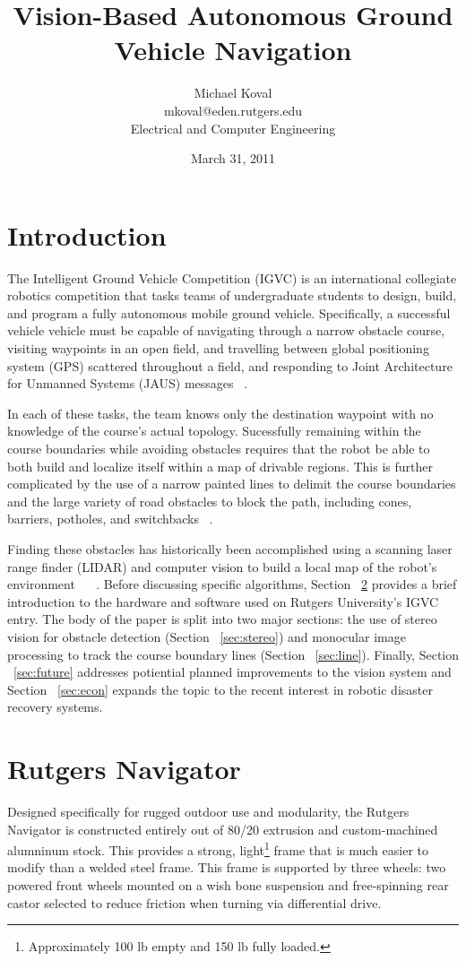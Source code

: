 \documentclass[11pt,twocolumn]{article}
\title{Vision-Based Autonomous Ground Vehicle Navigation}
\date{March 31, 2011}
\author{
	Michael Koval \\
	mkoval@eden.rutgers.edu \\
	Electrical and Computer Engineering
}
\begin{document}
\maketitle

\section{Introduction}
\label{sec:intro}
The Intelligent Ground Vehicle Competition (IGVC) is an international
collegiate robotics competition that tasks teams of undergraduate students to
design, build, and program a fully autonomous mobile ground vehicle.
Specifically, a successful vehicle vehicle must be capable of navigating
through a narrow obstacle course, visiting waypoints in an open field, and
travelling between global positioning system (GPS) scattered throughout a
field, and responding to Joint Architecture for Unmanned Systems (JAUS)
messages ~\cite{igvc11}.

In each of these tasks, the team knows only the destination waypoint with no
knowledge of the course's actual topology. Sucessfully remaining within the
course boundaries while avoiding obstacles requires that the robot be able to
both build and localize itself within a map of drivable regions. This is
further complicated by the use of a narrow painted lines to delimit the course
boundaries and the large variety of road obstacles to block the path, including
cones, barriers, potholes, and switchbacks ~\cite{igvc11}.

Finding these obstacles has historically been accomplished using a scanning
laser range finder (LIDAR) and computer vision to build a local map of the
robot's environment ~\cite{princeton08} ~\cite{delaware08}. Before discussing
specific algorithms, Section ~\ref{sec:robot} provides a brief introduction to
the hardware and software used on Rutgers University's IGVC entry. The body of
the paper is split into two major sections: the use of stereo vision for
obstacle detection (Section ~\ref{sec:stereo}) and monocular image processing
to track the course boundary lines (Section ~\ref{sec:line}). Finally, Section
~\ref{sec:future} addresses potiential planned improvements to the vision
system and Section ~\ref{sec:econ} expands the topic to the recent interest
in robotic disaster recovery systems.

\section{Rutgers Navigator}
\label{sec:robot}
Designed specifically for rugged outdoor use and modularity, the Rutgers
Navigator is constructed entirely out of 80/20 extrusion and custom-machined
alumninum stock. This provides a strong, light\footnote{Approximately 100 lb
empty and 150 lb fully loaded.} frame that is much easier to modify than a
welded steel frame. This frame is supported by three wheels: two powered front
wheels mounted on a wish bone suspension and free-spinning rear castor selected
to reduce friction when turning via differential drive.
\end{document}
